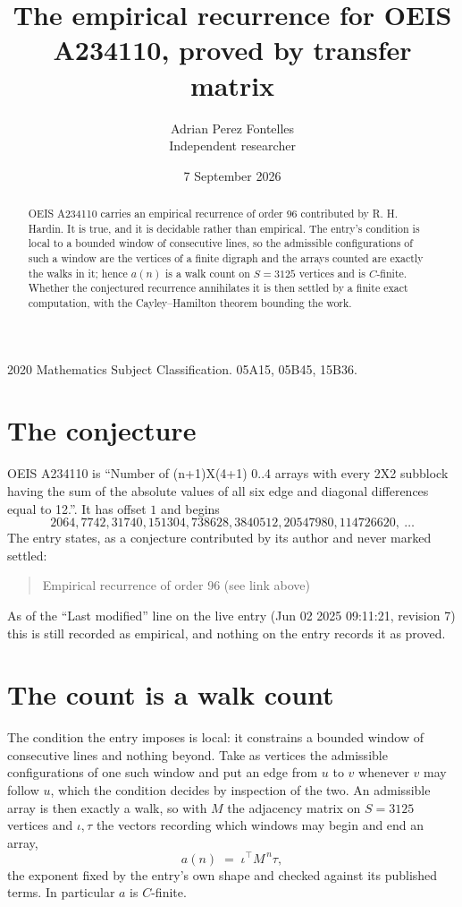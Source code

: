 \documentclass[11pt,a4paper]{article}
\title{The empirical recurrence for OEIS A234110, proved by transfer matrix}
\author{Adrian Perez Fontelles\\ \small Independent researcher}
\date{7 September 2026}
\theoremstyle{plain}
\theoremstyle{definition}
\begin{document}
\maketitle

\begin{abstract}
OEIS A234110 carries an empirical recurrence of order $96$ contributed by R. H. Hardin. It is
true, and it is decidable rather than empirical. The entry's condition is local to a bounded window of consecutive lines, so
the admissible configurations of such a window are the vertices of a finite digraph and the
arrays counted are exactly the walks in it; hence $a(n)$ is a walk count on $S=3125$ vertices
and is $C$-finite. Whether the conjectured recurrence annihilates it is then settled by a
finite exact computation, with the Cayley--Hamilton theorem bounding the work.
\end{abstract}

\noindent\small 2020 Mathematics Subject Classification. 05A15, 05B45, 15B36.\normalsize

\section{The conjecture}

OEIS A234110 is ``Number of (n+1)X(4+1) 0..4 arrays with every 2X2 subblock having the sum of the absolute values of all six edge and diagonal differences equal to 12.''. It has offset $1$ and begins
\[
2064, 7742, 31740, 151304, 738628, 3840512, 20547980, 114726620,\ \dots
\]
The entry states, as a conjecture contributed by its author and never marked settled:
\begin{quote}
Empirical recurrence of order 96 (see link above)
\end{quote}
As of the ``Last modified'' line on the live entry (Jun 02 2025 09:11:21, revision 7) this is still
recorded as empirical, and nothing on the entry records it as proved.

\section{The count is a walk count}

The condition the entry imposes is local: it constrains a bounded window of consecutive lines and nothing beyond. Take as
vertices the admissible configurations of one such window and put an edge from $u$ to $v$
whenever $v$ may follow $u$, which the condition decides by inspection of the two. An
admissible array is then exactly a walk, so with $M$ the adjacency matrix on $S=3125$ vertices
and $\iota,\tau$ the vectors recording which windows may begin and end an array,
\[
a(n)\;=\;\iota^{\!\top}M^{\,n}\tau ,
\]
the exponent fixed by the entry's own shape and checked against its published terms. In
particular $a$ is $C$-finite.
\end{document}
